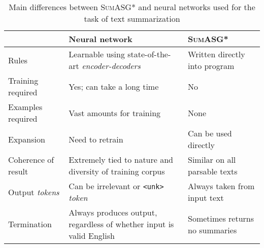\begin{table}[H]
\centering
\begin{tabular}{@{}L{0.25\textwidth}L{0.4\textwidth}L{0.35\textwidth}@{}}
\toprule
                                        & Neural network                                                                                              & \textsc{SumASG*}                        \\ \midrule
Rules                                   & Learnable using state-of-the-art \textit{encoder-decoders}                                 & Written directly into program  \\
Training required                       & Yes; can take a long time                                                                                   & No                             \\
Examples required                       & Vast amounts for training                                                                                   & None                           \\
Expansion                               & Need to retrain                                                                                             & Can be used directly           \\
Coherence of result                     & Extremely tied to nature and diversity of training corpus                                                   & Similar on all parsable texts  \\
Output \textit{tokens} & Can be irrelevant or \texttt{<unk>} \textit{token} & Always taken from input text   \\
Termination                             & Always produces output, regardless of whether input is valid English                                        & Sometimes returns no summaries \\ \bottomrule
\end{tabular}
\caption{Main differences between \textsc{SumASG*} and neural networks used for the task of text summarization}
\label{fig:takeaways}
\end{table}